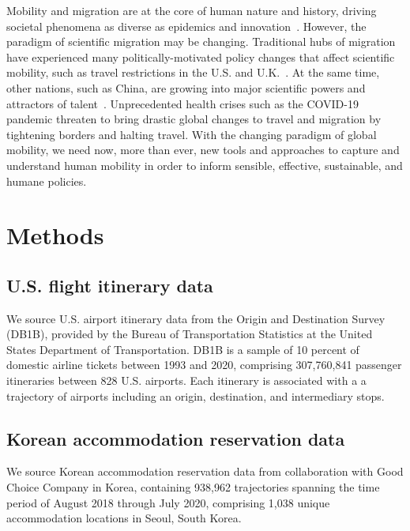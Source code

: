 \documentclass[12pt]{article} %
\begin{document}
Mobility and migration are at the core of human nature and history, driving societal phenomena as diverse as epidemics\autocite{kraemer2020covid, truscott2012epidemicgravity} and innovation~\autocite{kaiser2018innovation, sugimoto2017mostimpact, petersen2018multiscale, morgan2018prestige, rodrigues2016mobility}.
However, the paradigm of scientific migration may be changing.
Traditional hubs of migration have experienced many politically-motivated policy changes that affect scientific mobility, such as travel restrictions in the U.S. and U.K.~\autocite{chinchilla2018travelban}.
At the same time, other nations, such as China, are growing into major scientific powers and attractors of talent~\autocite{cao2020returning}.
Unprecedented health crises such as the COVID-19 pandemic threaten to bring drastic global changes to travel and migration by tightening borders and halting travel.
With the changing paradigm of global mobility, we need now, more than ever, new tools and approaches to capture and understand human mobility in order to inform sensible, effective, sustainable, and humane policies.


%
%
\section*{Methods}
\label{sec:datamethods} %

\subsection*{U.S. flight itinerary data}
We source U.S. airport itinerary data from the Origin and Destination Survey (DB1B), provided by the Bureau of Transportation Statistics at the United States Department of Transportation. 
DB1B is a sample of 10 percent of domestic airline tickets between 1993 and 2020, comprising 307,760,841 passenger itineraries between 828 U.S. airports. 
Each itinerary is associated with a a trajectory of airports including an origin, destination, and intermediary stops. 

\subsection*{Korean accommodation reservation data}
We source Korean accommodation reservation data from collaboration with Good Choice Company in Korea, containing 938,962 trajectories spanning the time period of August 2018 through July 2020,  comprising 1,038 unique accommodation locations in Seoul, South Korea. 
\end{document}
